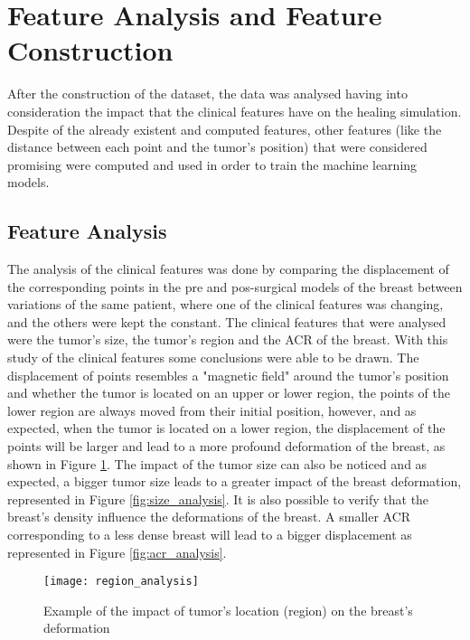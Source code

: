 \vspace{12mm}

\section{Feature Analysis and Feature Construction}

After the construction of the dataset, the data was analysed having into consideration the impact that the clinical features have on the healing simulation. Despite of the already existent and computed features, other features (like the distance between each point and the tumor's position) that were considered promising were computed and used in order to train the machine learning models.

\subsection{Feature Analysis} \label{subsec:feat_analysis}

The analysis of the clinical features was done by comparing the displacement of the corresponding points in the pre and pos-surgical models of the breast between variations of the same patient, where one of the clinical features was changing, and the others were kept the constant. The clinical features that were analysed were the tumor's size, the tumor's region and the ACR of the breast. With this study of the clinical features some conclusions were able to be drawn. The displacement of points resembles a "magnetic field" around the tumor's position and whether the tumor is located on an upper or lower region, the points of the lower region are always moved from their initial position, however, and as expected, when the tumor is located on a lower region, the displacement of the points will be larger and lead to a more profound deformation of the breast, as shown in Figure \ref{fig:region_analysis}. The impact of the tumor size can also be noticed and as expected, a bigger tumor size leads to a greater impact of the breast deformation, represented in Figure \ref{fig:size_analysis}. It is also possible to verify that the breast's density influence the deformations of the breast. A smaller ACR corresponding to a less dense breast will lead to a bigger displacement as represented in Figure \ref{fig:acr_analysis}.

\begin{figure}[!h]
\begin{center}
    \leavevmode
    \texttt{[image: region\_analysis]}
    \caption[Example of the impact of tumor's location (region) on the breast's deformation]{Example of the impact of tumor's location (region) on the breast's deformation}
    \label{fig:region_analysis}
  \end{center}
\end{figure}

